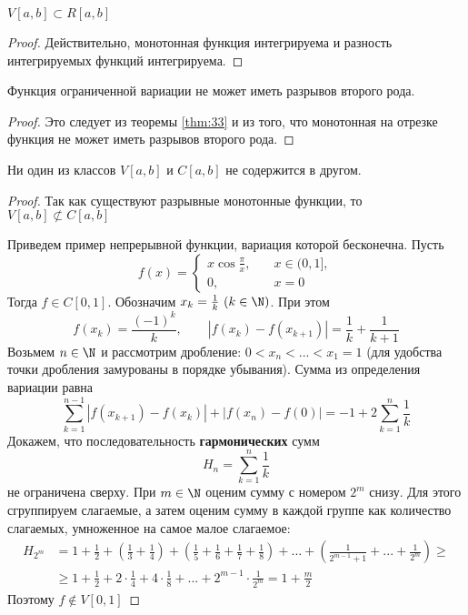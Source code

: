\begin{Cons}
	$V[a, b] \subset R[a, b]$ 
\end{Cons}

\begin{proof}
	Действительно, монотонная функция интегрируема и разность интегрируемых функций интегрируема.
\end{proof}

\begin{Cons}
	Функция ограниченной вариации не может иметь разрывов второго рода.
\end{Cons}

\begin{proof}
	Это следует из теоремы \ref{thm:33} и из того, что монотонная на отрезке функция не может иметь разрывов второго рода. 
\end{proof}

\begin{Cons}
	Ни один из классов $V[a, b]$ и $C[a, b]$ не содержится в другом.
\end{Cons}

\begin{proof}
	Так как существуют разрывные монотонные функции, то $V[a, b] \not\subset C[a, b]$
	
	Приведем пример непрерывной функции, вариация которой бесконечна. Пусть
	\[f(x) = \begin{cases}
		x \cos \frac{\pi}{x}, \quad & x \in (0, 1], \\
		0, \quad & x = 0
	\end{cases}\]
	Тогда $f \in C[0, 1]$. Обозначим $x_k = \frac{1}{k} \ (k \in \N)$. При этом
	\[f(x_k) = \frac{(-1)^k}{k}, \qquad |f(x_k) - f(x_{k + 1})| = \frac{1}{k} + \frac{1}{k + 1}\]
	Возьмем $n \in \N$ и рассмотрим дробление: $0 < x_n < ... < x_1 = 1$ (для удобства точки дробления замурованы в порядке убывания).
	Сумма из определения вариации равна
	\[\sum_{k = 1}^{n - 1} |f(x_{k + 1}) - f(x_k)| + |f(x_n) - f(0)| = -1 + 2 \sum_{k = 1}^n \frac{1}{k}\]
	Докажем, что последовательность \textbf{гармонических} сумм 
	\[H_n = \sum_{k=1}^{n} \frac{1}{k}\]
	не ограничена сверху. При $m \in \N$ оценим сумму с номером $2^m$ снизу.
	Для этого сгруппируем слагаемые, а затем оценим сумму в каждой группе как количество слагаемых, умноженное на самое малое слагаемое:
	\begin{align*}
		H_{2^m} &= 1 + \frac{1}{2} + \left(\frac{1}{3} + \frac{1}{4}\right) + \left(\frac{1}{5} + \frac{1}{6} + \frac{1}{7} + \frac{1}{8}\right) + ... + \left(\frac{1}{2^{m - 1} + 1} + ... + \frac{1}{2^m}\right) \geqslant \\
		&\geqslant 1 + \frac{1}{2} + 2 \cdot \frac{1}{4} + 4 \cdot \frac{1}{8} + ... + 2^{m - 1} \cdot \frac{1}{2^m} = 1 + \frac{m}{2}
	\end{align*}  
	Поэтому $f \notin V[0, 1]$ 
\end{proof}

